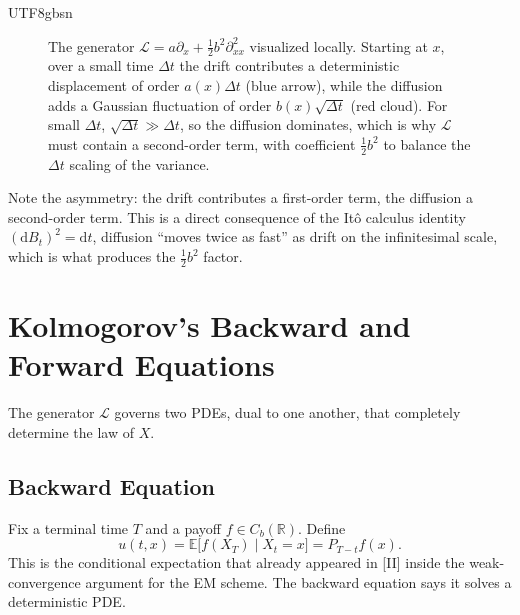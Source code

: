 \documentclass{article}
\begin{document}
\begin{CJK*}{UTF8}{gbsn}
\begin{figure}[h]
\caption{The generator $\mathcal{L}=a\partial_x+\tfrac{1}{2}b^2\partial_{xx}^2$ visualized locally. Starting at $x$, over a small time $\Delta t$ the drift contributes a deterministic displacement of order $a(x)\Delta t$ (blue arrow), while the diffusion adds a Gaussian fluctuation of order $b(x)\sqrt{\Delta t}$ (red cloud). For small $\Delta t$, $\sqrt{\Delta t}\gg\Delta t$, so the diffusion dominates, which is why $\mathcal L$ must contain a second-order term, with coefficient $\tfrac12 b^2$ to balance the $\Delta t$ scaling of the variance.}
\label{fig:generator}
\end{figure}

Note the asymmetry: the drift contributes a first-order term, the diffusion a second-order term. This is a direct consequence of the It\^o calculus identity $(\mathrm{d}B_t)^2=\mathrm{d}t$, diffusion ``moves twice as fast'' as drift on the infinitesimal scale, which is what produces the $\tfrac{1}{2}b^2$ factor.

\section{Kolmogorov's Backward and Forward Equations}

The generator $\mathcal{L}$ governs two PDEs, dual to one another, that completely determine the law of $X$.

\subsection{Backward Equation}

Fix a terminal time $T$ and a payoff $f\in C_b(\mathbb{R})$. Define
\[
  u(t,x)=\mathbb{E}\bigl[f(X_T)\mid X_t=x\bigr]=P_{T-t}f(x).
\]
This is the conditional expectation that already appeared in [II] inside the weak-convergence argument for the EM scheme. The backward equation says it solves a deterministic PDE.


\end{CJK*}
\end{document}
